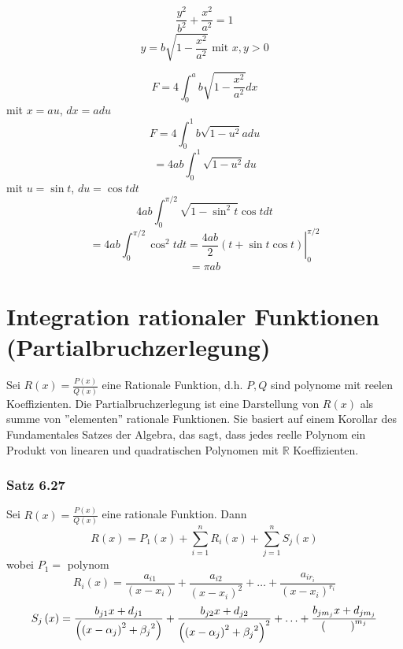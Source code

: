 \begin{enumerate}
\begin{figure}[ht]
\begin{minipage}[b]{0.45\linewidth}
\centering
{}

\end{minipage}
\hspace{0.5cm}
\begin{minipage}[b]{0.45\linewidth}

\centering
$$\frac{y^2}{b^2}+\frac{x^2}{a^2}=1$$
$$y=b\sqrt{1-\frac{x^2}{a^2}}\text{ mit }x,y>0$$

\end{minipage}
\end{figure}
$$F=4\int ^{a}_{0}b\sqrt {1-\dfrac {x^{2}}{a^{2}}}dx$$
mit $x=au$, $dx=adu$ $$F=4\int ^{1}_{0}b\sqrt {1-u^2}adu$$$$=4ab\int ^{1}_{0}\sqrt {1-u^2}du$$ mit $u=\sin t$, $du=\cos tdt$
$$4ab\int ^{\pi /2}_{0}\sqrt {1-\sin^2t}\cos t dt$$$$=4ab\int ^{\pi /2}_{0}\cos ^{2}tdt=\left.\frac{4ab}{2}\left( t+\sin t\cos t\right) \right| ^{\pi /2}_{0}$$ $$=\pi ab$$
\end{enumerate}  



\section{Integration rationaler Funktionen (Partialbruchzerlegung)}
Sei $R(x)=\frac{P(x)}{Q(x)}$ eine Rationale Funktion, d.h. $P,Q$ sind polynome mit reelen Koeffizienten. Die Partialbruchzerlegung ist eine Darstellung von $R(x)$ als summe von ''elementen'' rationale Funktionen. Sie basiert auf einem Korollar des Fundamentales Satzes der Algebra, das sagt, dass jedes reelle Polynom ein Produkt von linearen und quadratischen Polynomen mit $\mathbb{R}$ Koeffizienten. 

\subsubsection*{Satz 6.27}
Sei $R(x)=\frac{P(x)}{Q(x)}$ eine rationale Funktion. Dann $$R(x)=P_1(x)+\sum ^{n}_{i=1}R_{i}\left( x\right) +\sum ^{n}_{j=1}S_{j}\left( x\right) $$ wobei $P_1=$ polynom $$R_{i}\left( x\right) =\dfrac {a_{i1}}{\left( x-x_{i}\right) }+\dfrac {a_{i2}}{\left( x-x_{i}\right) ^{2}}+\ldots +\dfrac {a_{ir_{i}}}{{\left( x-x_{i}\right)}^{r_i} }$$  $$S_{j}\left( x\right) =\dfrac {b_{j1}x+{d_{j1}}}{\left( \left(x-\alpha_{j}\right)^2+{\beta_{j}}^2\right) }+\dfrac {b_{j2}x+{d_{j2}}}{\left( \left(x-\alpha_{j}\right)^2+{\beta_{j}}^2\right)^2 }+\ldots +\dfrac {b_{j m_j}x+{d_{j m_j}}}{\left( \text{\hspace{8mm}}\right)^{m_j} }$$

